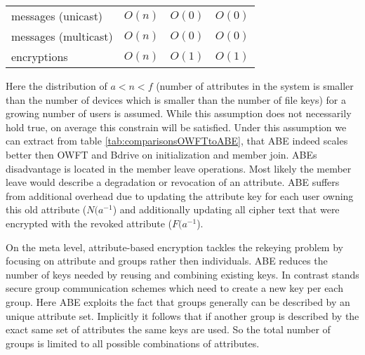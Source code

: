 \begin{table*}[!ht]
\begin{tabular}{l 		| l 						| l 						| l }
messages (unicast)		& $O(n)$	 				& $O(0)$					& $O(0)$			\\
messages (multicast)	& $O(n)$ 					& $O(0)$ 					& $O(0)$			\\
encryptions				& $O(n)$ 					& $O(1)$					& $O(1)$			\\
\hline
\end{tabular}
\caption{Comparison of Bdrive, \ac{GKMP} and \ac{ABE} scheme. $n$ donating the number of members, $N$ the number of all users in the system, $f$ the number of file keys in the group, $F$ the number of all filekeys, $a$ the number of attributes used for this group, $A$ all attributes }
\label{tab:comparisonsOWFTtoABE}
\end{table*}

Here the distribution of $a < n < f$ (number of attributes in the system is smaller than the number of devices which is smaller than the number of file keys) for a growing number of users is assumed. While this assumption does not necessarily hold true, on average this constrain will be satisfied. Under this assumption we can extract from table \ref{tab:comparisonsOWFTtoABE}, that \ac{ABE} indeed scales better then \ac{OWFT} and Bdrive on initialization and member join. ABEs disadvantage is located in the member leave operations. Most likely the member leave would describe a degradation or revocation of an attribute. \ac{ABE} suffers from additional overhead due to updating the attribute key for each user owning this old attribute ($N(a^{-1}$) and additionally updating all cipher text that were encrypted with the revoked attribute ($F(a^{-1}$).

On the meta level, attribute-based encryption tackles the rekeying problem by focusing on attribute and groups rather then individuals. \ac{ABE} reduces the number of keys needed by reusing and combining existing keys. In contrast stands secure group communication schemes which need to create a new key per each group. Here \ac{ABE} exploits the fact that groups generally can be described by an unique attribute set. Implicitly it follows that if another group is described by the exact same set of attributes the same keys are used. So the total number of groups is limited to all possible combinations of attributes. 


